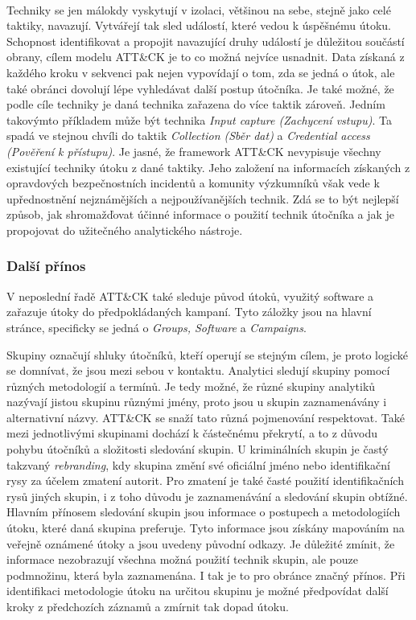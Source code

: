 \paragraph{}
Techniky se jen málokdy vyskytují v izolaci, většinou na sebe, stejně jako celé taktiky, navazují.
Vytvářejí tak sled událostí, které vedou k úspěšnému útoku.
Schopnost identifikovat a propojit navazující druhy událostí je důležitou součástí obrany, cílem modelu ATT\&CK je to co možná nejvíce usnadnit.
Data získaná z každého kroku v sekvenci pak nejen vypovídají o tom, zda se jedná o útok, ale také obránci dovolují lépe vyhledávat další postup útočníka.
Je také možné, že podle cíle techniky je daná technika zařazena do více taktik zároveň.
Jedním takovýmto příkladem může být technika \textit{Input capture (Zachycení vstupu)}.
Ta spadá ve stejnou chvíli do taktik \textit{Collection (Sběr dat)} a \textit{Credential access (Pověření k přístupu)}.
Je jasné, že framework ATT\&CK nevypisuje všechny existující techniky útoku z dané taktiky.
Jeho založení na informacích získaných z opravdových bezpečnostních incidentů a komunity výzkumníků však vede k upřednostnění nejznámějších a nejpoužívanějších technik.
Zdá se to být nejlepší způsob, jak shromažďovat účinné informace o použití technik útočníka a jak je propojovat do užitečného analytického nástroje.\cite{Mitre_finding_cyber_threats, mitre_attack_framework}

\subsubsection{Další přínos}
V neposlední řadě ATT\&CK také sleduje původ útoků, využitý software a zařazuje útoky do předpokládaných kampaní.
Tyto záložky jsou na hlavní stránce, specificky se jedná o \textit{Groups, Software} a \textit{Campaigns}.

Skupiny označují shluky útočníků, kteří operují se stejným cílem, je proto logické se domnívat, že jsou mezi sebou v kontaktu.
Analytici sledují skupiny pomocí různých metodologií a termínů.
Je tedy možné, že různé skupiny analytiků nazývají jistou skupinu různými jmény, proto jsou u skupin zaznamenávány i alternativní názvy.
ATT\&CK se snaží tato různá pojmenování respektovat.
Také mezi jednotlivými skupinami dochází k částečnému překrytí, a to z důvodu pohybu útočníků a složitosti sledování skupin.
U kriminálních skupin je častý takzvaný \textit{rebranding}, kdy skupina změní své oficiální jméno nebo identifikační rysy za účelem zmatení autorit.
Pro zmatení je také časté použití identifikačních rysů jiných skupin, i z toho důvodu je zaznamenávání a sledování skupin obtížné.
Hlavním přínosem sledování skupin jsou informace o postupech a metodologiích útoku, které daná skupina preferuje.
Tyto informace jsou získány mapováním na veřejně oznámené útoky a jsou uvedeny původní odkazy.
Je důležité zmínit, že informace nezobrazují všechna možná použití technik skupin, ale pouze podmnožinu, která byla zaznamenána.
I tak je to pro obránce značný přínos.
Při identifikaci metodologie útoku na určitou skupinu je možné předpovídat další kroky z předchozích záznamů a zmírnit tak dopad útoku.\cite{Mitre_groups}


